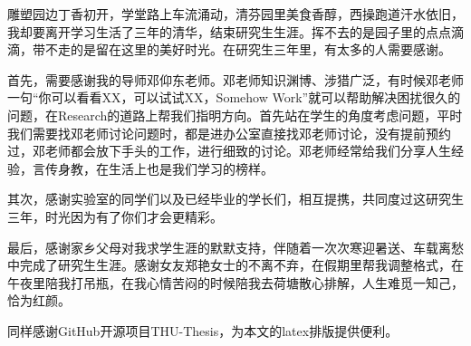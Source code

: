 \begin{acknowledgement}
	
	雕塑园边丁香初开，学堂路上车流涌动，清芬园里美食香醇，西操跑道汗水依旧，我却要离开学习生活了三年的清华，结束研究生生涯。挥不去的是园子里的点点滴滴，带不走的是留在这里的美好时光。在研究生三年里，有太多的人需要感谢。

	首先，需要感谢我的导师邓仰东老师。邓老师知识渊博、涉猎广泛，有时候邓老师一句“你可以看看XX，可以试试XX，Somehow Work”就可以帮助解决困扰很久的问题，在Research的道路上帮我们指明方向。首先站在学生的角度考虑问题，平时我们需要找邓老师讨论问题时，都是进办公室直接找邓老师讨论，没有提前预约过，邓老师都会放下手头的工作，进行细致的讨论。邓老师经常给我们分享人生经验，言传身教，在生活上也是我们学习的榜样。
	
	其次，感谢实验室的同学们以及已经毕业的学长们，相互提携，共同度过这研究生三年，时光因为有了你们才会更精彩。	

	最后，感谢家乡父母对我求学生涯的默默支持，伴随着一次次寒迎暑送、车载离愁中完成了研究生生涯。感谢女友郑艳女士的不离不弃，在假期里帮我调整格式，在午夜里陪我打吊瓶，在我心情苦闷的时候陪我去荷塘散心排解，人生难觅一知己，恰为红颜。%
	
	同样感谢GitHub开源项目THU-Thesis，为本文的latex排版提供便利。

\end{acknowledgement}
